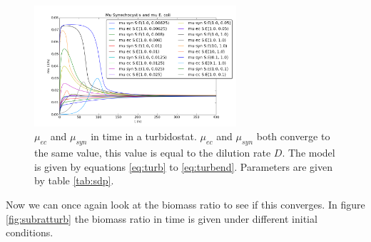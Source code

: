 \documentclass[12pt]{report}
\begin{document}
\begin{figure}[htbp]
    \hfill
  \begin{minipage}{.45\textwidth}
   \begin{center}
     \includegraphics[width=7.5cm]{sub_dependent_turbidostat_mus.png}
     \caption{$\mu_{ec}$ and $\mu_{syn}$ in time in a turbidostat. $\mu_{ec}$ and $\mu_{syn}$ both converge to the same value, this value is equal to the dilution rate $D$. The model is given by equations \ref{eq:turb} to \ref{eq:turbend}. Parameters are given by table \ref{tab:sdp}.}
    \label{fig:submusratturb}
   \end{center}
  \end{minipage}
\end{figure}



Now we can once again look at the biomass ratio to see if this converges. In figure \ref{fig:subratturb} the biomass ratio in time is given under different initial conditions.

\end{document}
